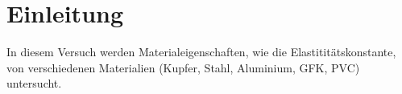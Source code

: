 \section{Einleitung}


In diesem Versuch werden Materialeigenschaften, wie die Elastititätskonstante, von verschiedenen Materialien (Kupfer, Stahl, Aluminium, GFK, PVC) untersucht.